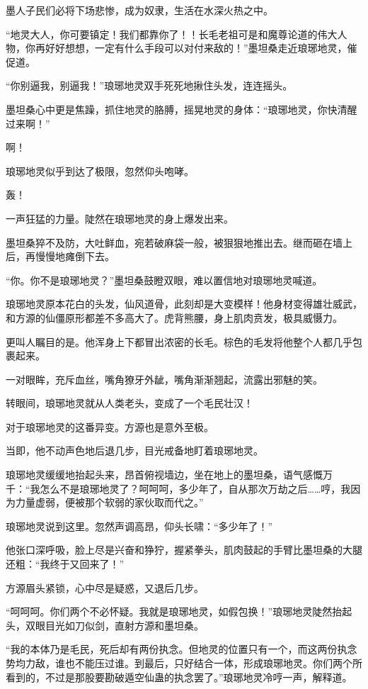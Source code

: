 \begin{this_body}
墨人子民们必将下场悲惨，成为奴隶，生活在水深火热之中。

“地灵大人，你可要镇定！我们都靠你了！！长毛老祖可是和魔尊论道的伟大人物，你再好好想想，一定有什么手段可以对付来敌的！”墨坦桑走近琅琊地灵，催促道。

“你别逼我，别逼我！”琅琊地灵双手死死地揪住头发，连连摇头。

墨坦桑心中更是焦躁，抓住地灵的胳膊，摇晃地灵的身体：“琅琊地灵，你快清醒过来啊！”

啊！

琅琊地灵似乎到达了极限，忽然仰头咆哮。

轰！

一声狂猛的力量。陡然在琅琊地灵的身上爆发出来。

墨坦桑猝不及防，大吐鲜血，宛若破麻袋一般，被狠狠地推出去。继而砸在墙上后，再慢慢地瘫倒下去。

“你。你不是琅琊地灵？”墨坦桑鼓瞪双眼，难以置信地对琅琊地灵喊道。

琅琊地灵原本花白的头发，仙风道骨，此刻却是大变模样！他身材变得雄壮威武，和方源的仙僵原形都差不多高大了。虎背熊腰，身上肌肉贲发，极具威慑力。

更叫人瞩目的是。他浑身上下都冒出浓密的长毛。棕色的毛发将他整个人都几乎包裹起来。

一对眼眸，充斥血丝，嘴角獠牙外龇，嘴角渐渐翘起，流露出邪魅的笑。

转眼间，琅琊地灵就从人类老头，变成了一个毛民壮汉！

对于琅琊地灵的这番异变。方源也是意外至极。

当即，他不动声色地后退几步，目光戒备地盯着琅琊地灵。

琅琊地灵缓缓地抬起头来，昂首俯视墙边，坐在地上的墨坦桑，语气感慨万千：“我怎么不是琅琊地灵了？呵呵呵，多少年了，自从那次万劫之后……哼，我因为力量虚弱，便被那个软弱的家伙取而代之。”

琅琊地灵说到这里。忽然声调高昂，仰头长啸：“多少年了！”

他张口深呼吸，脸上尽是兴奋和狰狞，握紧拳头，肌肉鼓起的手臂比墨坦桑的大腿还粗：“我终于又回来了！”

方源眉头紧锁，心中尽是疑惑，又退后几步。

“呵呵呵。你们两个不必怀疑。我就是琅琊地灵，如假包换！”琅琊地灵陡然抬起头，双眼目光如刀似剑，直射方源和墨坦桑。

“我的本体乃是毛民，死后却有两份执念。但地灵的位置只有一个，而这两份执念势均力敌，谁也不能压过谁。到最后，只好结合一体，形成琅琊地灵。你们两个所看到的，不过是那股要勘破遁空仙蛊的执念罢了。”琅琊地灵冷哼一声，解释道。


\end{this_body}
